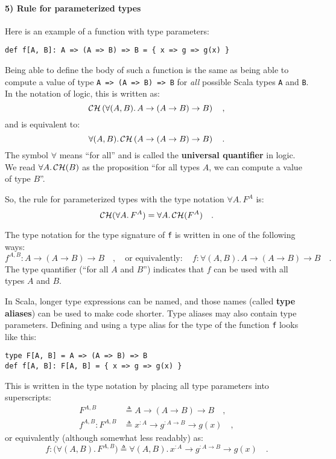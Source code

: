 \paragraph{5) Rule for parameterized types}

Here is an example of a function with type parameters:
\begin{lstlisting}
def f[A, B]: A => (A => B) => B = { x => g => g(x) }
\end{lstlisting}
Being able to define the body of such a function is the same as being
able to compute a value of type \lstinline!A => (A => B) => B! for
\emph{all} possible Scala types \lstinline!A! and \lstinline!B!.
In the notation of logic, this is written as:
\[
{\cal CH}\left(\forall(A,B).\,A\rightarrow(A\rightarrow B)\rightarrow B\right)\quad,
\]
and is equivalent to:
\[
\forall(A,B).\,{\cal CH}\left(A\rightarrow(A\rightarrow B)\rightarrow B\right)\quad.
\]
The symbol $\forall$ means \textsf{``}for all\textsf{''} and is called the \textbf{universal
quantifier} in logic. We read $\forall A.\,{\cal CH}(B)$ as the proposition
\textsf{``}for all types $A$, we can compute a value of type $B$\textsf{''}.

So, the rule for parameterized types with the type notation $\forall A.\,F^{A}$
is:
\[
{\cal CH}(\forall A.\,F^{A})=\forall A.\,{\cal CH}(F^{A})\quad.
\]

The type notation for the type signature of \lstinline!f! is written
in one of the following ways:
\[
f^{A,B}:A\rightarrow\left(A\rightarrow B\right)\rightarrow B\quad,\quad\text{or equivalently}:\quad f:\forall(A,B).\,A\rightarrow\left(A\rightarrow B\right)\rightarrow B\quad.
\]
The type quantifier (\textsf{``}for all $A$ and $B$\textsf{''}) indicates that $f$
can be used with all types $A$ and $B$.

In Scala, longer type expressions can be named, and those names (called
\textbf{type aliases}) can be used to make code
shorter. Type aliases may also contain type parameters. Defining and
using a type alias for the type of the function \lstinline!f! looks
like this:
\begin{lstlisting}
type F[A, B] = A => (A => B) => B
def f[A, B]: F[A, B] = { x => g => g(x) }
\end{lstlisting}
This is written in the type notation by placing all type parameters
into superscripts:
\begin{align*}
F^{A,B} & \triangleq A\rightarrow\left(A\rightarrow B\right)\rightarrow B\quad,\\
f^{A,B}:F^{A,B} & \triangleq x^{:A}\rightarrow g^{:A\rightarrow B}\rightarrow g(x)\quad,
\end{align*}
or equivalently (although somewhat less readably) as:
\[
f:\big(\forall(A,B).\,F^{A,B}\big)\triangleq\forall(A,B).\,x^{:A}\rightarrow g^{:A\rightarrow B}\rightarrow g(x)\quad.
\]

